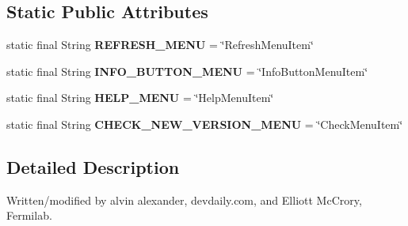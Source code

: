 \subsection*{Static Public Attributes}
\begin{DoxyCompactItemize}
\item 
\hypertarget{classgov_1_1fnal_1_1ppd_1_1dd_1_1changer_1_1FileMenu_ae6c6477bb6dcf6f725fba6d32aefc3ee}{static final String {\bfseries R\-E\-F\-R\-E\-S\-H\-\_\-\-M\-E\-N\-U} = \char`\"{}Refresh\-Menu\-Item\char`\"{}}\label{classgov_1_1fnal_1_1ppd_1_1dd_1_1changer_1_1FileMenu_ae6c6477bb6dcf6f725fba6d32aefc3ee}

\item 
\hypertarget{classgov_1_1fnal_1_1ppd_1_1dd_1_1changer_1_1FileMenu_abce65935f1c446474f9a3c9c332a8210}{static final String {\bfseries I\-N\-F\-O\-\_\-\-B\-U\-T\-T\-O\-N\-\_\-\-M\-E\-N\-U} = \char`\"{}Info\-Button\-Menu\-Item\char`\"{}}\label{classgov_1_1fnal_1_1ppd_1_1dd_1_1changer_1_1FileMenu_abce65935f1c446474f9a3c9c332a8210}

\item 
\hypertarget{classgov_1_1fnal_1_1ppd_1_1dd_1_1changer_1_1FileMenu_a5c034e4370302b5ca64ca090934a2331}{static final String {\bfseries H\-E\-L\-P\-\_\-\-M\-E\-N\-U} = \char`\"{}Help\-Menu\-Item\char`\"{}}\label{classgov_1_1fnal_1_1ppd_1_1dd_1_1changer_1_1FileMenu_a5c034e4370302b5ca64ca090934a2331}

\item 
\hypertarget{classgov_1_1fnal_1_1ppd_1_1dd_1_1changer_1_1FileMenu_a06f9ec85c25e8ca8d123549044d827d7}{static final String {\bfseries C\-H\-E\-C\-K\-\_\-\-N\-E\-W\-\_\-\-V\-E\-R\-S\-I\-O\-N\-\_\-\-M\-E\-N\-U} = \char`\"{}Check\-Menu\-Item\char`\"{}}\label{classgov_1_1fnal_1_1ppd_1_1dd_1_1changer_1_1FileMenu_a06f9ec85c25e8ca8d123549044d827d7}

\end{DoxyCompactItemize}


\subsection{Detailed Description}
Written/modified by alvin alexander, devdaily.\-com, and Elliott Mc\-Crory, Fermilab. 

